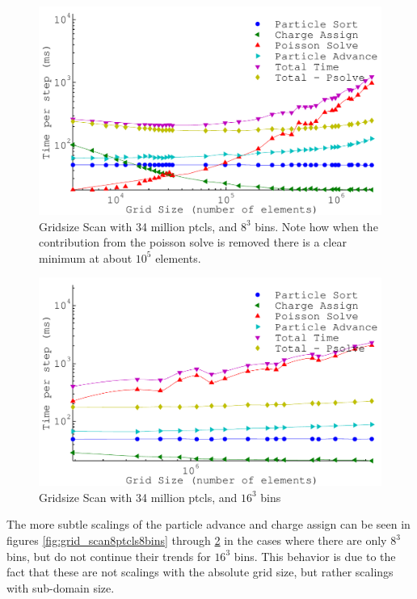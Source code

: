\begin{figure}[H]
\begin{center}
\includegraphics[width=6in]{performance/gridsize_scan34ptcls8bins.pdf}
\end{center}
\caption{Gridsize Scan with 34 million ptcls, and $8^3$ bins. Note how when the contribution from the poisson solve is removed there is a clear minimum at about $10^5$ elements. }
\label{fig:grid_scan34ptcls8bins}
\end{figure}

\begin{figure}[H]
\begin{center}
\includegraphics[width=6in]{performance/gridsize_scan34ptcls16bins.pdf}
\end{center}
\caption{Gridsize Scan with 34 million ptcls, and $16^3$ bins}
\label{fig:grid_scan34ptcls16bins}
\end{figure}

The more subtle scalings of the particle advance and charge assign can be seen in figures \ref{fig:grid_scan8ptcls8bins} through \ref{fig:grid_scan34ptcls16bins} in the cases where there are only $8^3$ bins, but do not continue their trends for $16^3$ bins. This behavior is due to the fact that these are not scalings with the absolute grid size, but rather scalings with sub-domain size.

